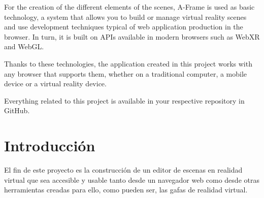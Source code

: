 \documentclass[a4paper, 12pt]{book}
\begin{document}
For the creation of the different elements of the scenes, A-Frame is used as basic technology, a system that allows you to build or manage virtual reality scenes and use development techniques typical of web application production in the browser. In turn, it is built on APIs available in modern browsers such as WebXR and WebGL.

Thanks to these technologies, the application created in this project works with any browser that supports them, whether on a traditional computer, a mobile device or a virtual reality device.

Everything related to this project is available in your respective repository in GitHub.




\tableofcontents 
\cleardoublepage
\listoffigures %




\cleardoublepage
\chapter{Introducción}
\label{sec:intro} %

El fin de este proyecto es la construcción de un editor de escenas en realidad virtual que sea accesible y usable tanto desde un navegador web como desde otras herramientas creadas para ello, como pueden ser, las gafas de realidad virtual.
\end{document}
